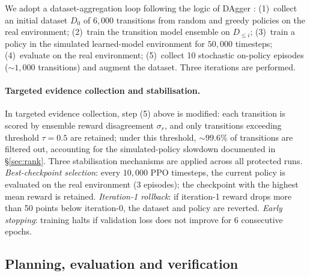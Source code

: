 \documentclass[11pt]{article}
\begin{document}
We adopt a dataset-aggregation loop following the logic of DAgger \citep{ross2011reduction}: (1)~collect an initial dataset $D_0$ of $6{,}000$ transitions from random and greedy policies on the real environment; (2)~train the transition model ensemble on $D_{\leq i}$; (3)~train a policy in the simulated learned-model environment for $50{,}000$ timesteps; (4)~evaluate on the real environment; (5)~collect 10 stochastic on-policy episodes ($\sim$$1{,}000$ transitions) and augment the dataset. Three iterations are performed.

\paragraph{Targeted evidence collection and stabilisation.}

In targeted evidence collection, step (5) above is modified: each transition is scored by ensemble reward disagreement $\sigma_r$, and only transitions exceeding threshold $\tau = 0.5$ are retained; under this threshold, $\sim$$99.6\%$ of transitions are filtered out, accounting for the simulated-policy slowdown documented in \S\ref{sec:rank}. Three stabilisation mechanisms are applied across all protected runs. \emph{Best-checkpoint selection}: every $10{,}000$ PPO timesteps, the current policy is evaluated on the real environment (3 episodes); the checkpoint with the highest mean reward is retained. \emph{Iteration-1 rollback}: if iteration-1 reward drops more than 50 points below iteration-0, the dataset and policy are reverted. \emph{Early stopping}: training halts if validation loss does not improve for 6 consecutive epochs.

\subsection{Planning, evaluation and verification}\label{sec:methods-mpc}
\end{document}
